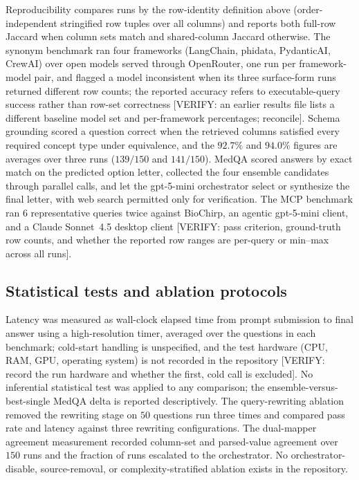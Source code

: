 Reproducibility compares runs by the row-identity definition above (order-independent stringified row tuples over all columns) and reports both full-row Jaccard when column sets match and shared-column Jaccard otherwise. The synonym benchmark ran four frameworks (LangChain, phidata, PydanticAI, CrewAI) over open models served through OpenRouter, one run per framework-model pair, and flagged a model inconsistent when its three surface-form runs returned different row counts; the reported accuracy refers to executable-query success rather than row-set correctness [VERIFY: an earlier results file lists a different baseline model set and per-framework percentages; reconcile]. Schema grounding scored a question correct when the retrieved columns satisfied every required concept type under equivalence, and the $92.7\%$ and $94.0\%$ figures are averages over three runs ($139/150$ and $141/150$). MedQA scored answers by exact match on the predicted option letter, collected the four ensemble candidates through parallel calls, and let the gpt-5-mini orchestrator select or synthesize the final letter, with web search permitted only for verification. The MCP benchmark ran $6$ representative queries twice against BioChirp, an agentic gpt-5-mini client, and a Claude Sonnet~4.5 desktop client [VERIFY: pass criterion, ground-truth row counts, and whether the reported row ranges are per-query or min--max across all runs].

\subsection*{Statistical tests and ablation protocols}

Latency was measured as wall-clock elapsed time from prompt submission to final answer using a high-resolution timer, averaged over the questions in each benchmark; cold-start handling is unspecified, and the test hardware (CPU, RAM, GPU, operating system) is not recorded in the repository [VERIFY: record the run hardware and whether the first, cold call is excluded]. No inferential statistical test was applied to any comparison; the ensemble-versus-best-single MedQA delta is reported descriptively. The query-rewriting ablation removed the rewriting stage on $50$ questions run three times and compared pass rate and latency against three rewriting configurations. The dual-mapper agreement measurement recorded column-set and parsed-value agreement over $150$ runs and the fraction of runs escalated to the orchestrator. No orchestrator-disable, source-removal, or complexity-stratified ablation exists in the repository.

